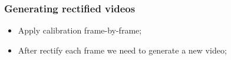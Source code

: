 \documentclass{beamer}
\begin{document}
		\begin{frame}\frametitle{Generating rectified videos}
			\begin{itemize}
				\item Apply calibration frame-by-frame;
				\item After rectify each frame we need to generate a new video;



			 \end{itemize}
			 \begin{figure}[htb!]
				\center
				\label{fig:undistort}
			\end{figure}

		\end{frame}
\end{document}
